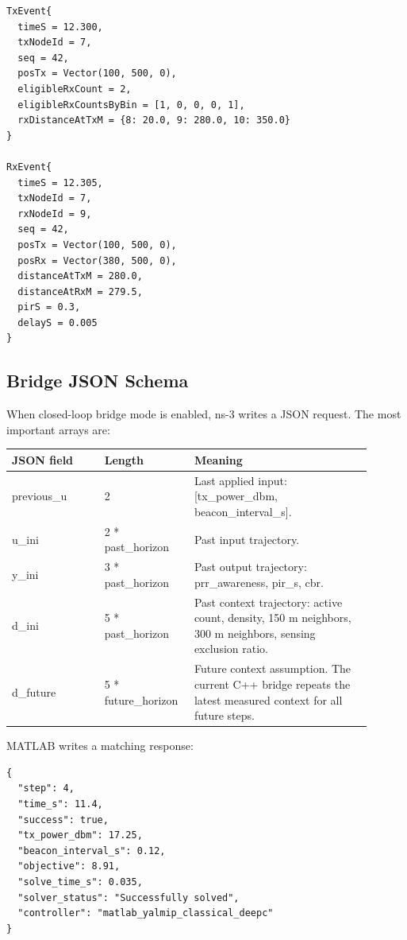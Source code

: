 \documentclass[11pt]{article}
\DeclareRobustCommand{\code}[1]{\texttt{\detokenize{#1}}}
\def\code#1{#1}%
\begin{document}
\begin{lstlisting}[style=textstyle, caption={Example packet events used for PRR and PIR.}]
TxEvent{
  timeS = 12.300,
  txNodeId = 7,
  seq = 42,
  posTx = Vector(100, 500, 0),
  eligibleRxCount = 2,
  eligibleRxCountsByBin = [1, 0, 0, 0, 1],
  rxDistanceAtTxM = {8: 20.0, 9: 280.0, 10: 350.0}
}

RxEvent{
  timeS = 12.305,
  txNodeId = 7,
  rxNodeId = 9,
  seq = 42,
  posTx = Vector(100, 500, 0),
  posRx = Vector(380, 500, 0),
  distanceAtTxM = 280.0,
  distanceAtRxM = 279.5,
  pirS = 0.3,
  delayS = 0.005
}
\end{lstlisting}

\subsection{Bridge JSON Schema}

When closed-loop bridge mode is enabled, ns-3 writes a JSON request.  The most
important arrays are:

\begin{center}
\begin{tabular}{L{0.24\linewidth}L{0.20\linewidth}L{0.46\linewidth}}
\toprule
JSON field & Length & Meaning \\
\midrule
\code{previous_u} & \code{2} &
Last applied input: \code{[tx_power_dbm, beacon_interval_s]}. \\
\code{u_ini} & \code{2 * past_horizon} &
Past input trajectory. \\
\code{y_ini} & \code{3 * past_horizon} &
Past output trajectory: \code{prr_awareness}, \code{pir_s}, \code{cbr}. \\
\code{d_ini} & \code{5 * past_horizon} &
Past context trajectory: active count, density, 150 m neighbors, 300 m
neighbors, sensing exclusion ratio. \\
\code{d_future} & \code{5 * future_horizon} &
Future context assumption.  The current C++ bridge repeats the latest measured
context for all future steps. \\
\bottomrule
\end{tabular}
\end{center}

MATLAB writes a matching response:

\begin{lstlisting}[style=textstyle, caption={Example DeePC response JSON.}]
{
  "step": 4,
  "time_s": 11.4,
  "success": true,
  "tx_power_dbm": 17.25,
  "beacon_interval_s": 0.12,
  "objective": 8.91,
  "solve_time_s": 0.035,
  "solver_status": "Successfully solved",
  "controller": "matlab_yalmip_classical_deepc"
}
\end{lstlisting}
\end{document}
